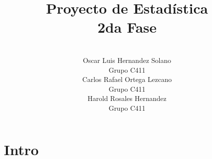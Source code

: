 \documentclass[a4paper,10pt,twocolumn]{article}
\title{Proyecto de Estad\'istica \\ 2da Fase}
\author{\\
	\name Oscar Luis Hernandez Solano \\ \addr Grupo C411 \\
	\name Carlos Rafael Ortega Lezcano \\ \addr Grupo C411 \\
	\name Harold Rosales Hernandez \\ \addr Grupo C411 }
\begin{document}



\section*{Intro}\label{sec:intro}

\lipsum[1]
\end{document}
